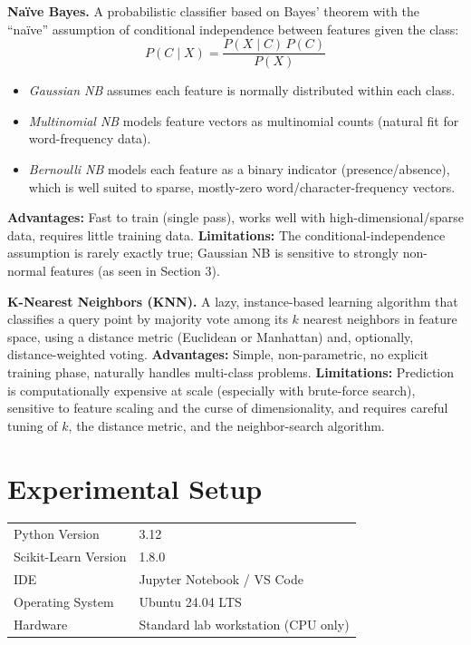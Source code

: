 \documentclass[12pt,a4paper]{article}
\newenvironment{fitwidth}
  {\begin{lrbox}{\fitbox}}
  {\end{lrbox}\ifdim\wd\fitbox>\linewidth\resizebox{\linewidth}{!}{\usebox{\fitbox}}\else\usebox{\fitbox}\fi}
\DeclareRobustCommand{\_}{\textunderscore\allowbreak}
\begin{document}
\textbf{Na\"ive Bayes.} A probabilistic classifier based on Bayes' theorem
with the ``na\"ive'' assumption of conditional independence between features
given the class:
\[
P(C \mid X) = \frac{P(X \mid C)\,P(C)}{P(X)}
\]
\begin{itemize}
\item \textit{Gaussian NB} assumes each feature is normally distributed
within each class.
\item \textit{Multinomial NB} models feature vectors as multinomial counts
(natural fit for word-frequency data).
\item \textit{Bernoulli NB} models each feature as a binary indicator
(presence/absence), which is well suited to sparse, mostly-zero
word/character-frequency vectors.
\end{itemize}
\textbf{Advantages:} Fast to train (single pass), works well with
high-dimensional/sparse data, requires little training data.
\textbf{Limitations:} The conditional-independence assumption is rarely
exactly true; Gaussian NB is sensitive to strongly non-normal features (as
seen in Section 3).

\textbf{K-Nearest Neighbors (KNN).} A lazy, instance-based learning
algorithm that classifies a query point by majority vote among its $k$
nearest neighbors in feature space, using a distance metric (Euclidean or
Manhattan) and, optionally, distance-weighted voting.
\textbf{Advantages:} Simple, non-parametric, no explicit training phase,
naturally handles multi-class problems.
\textbf{Limitations:} Prediction is computationally expensive at scale
(especially with brute-force search), sensitive to feature scaling and the
curse of dimensionality, and requires careful tuning of $k$, the distance
metric, and the neighbor-search algorithm.

\section{Experimental Setup}
\begin{center}
\begin{minipage}{\linewidth}\centering
\begin{fitwidth}
\begin{tabular}{ll}
\toprule
Python Version & 3.12 \\
Scikit-Learn Version & 1.8.0 \\
IDE & Jupyter Notebook / VS Code \\
Operating System & Ubuntu 24.04 LTS \\
Hardware & Standard lab workstation (CPU only) \\
\bottomrule
\end{tabular}
\end{fitwidth}
\end{minipage}
\end{center}
\end{document}
